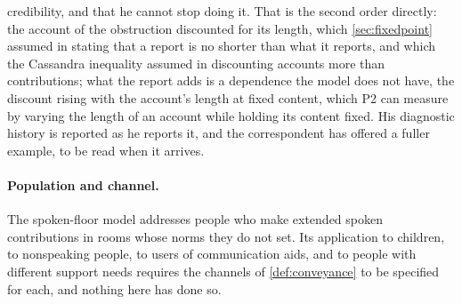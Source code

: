 credibility, and that he cannot stop doing it. That is the second order directly: the account of the obstruction discounted for its length, which \autoref{sec:fixedpoint} assumed in stating that a report is no shorter than what it reports, and which the Cassandra inequality assumed in discounting accounts more than contributions; what the report adds is a dependence the model does not have, the discount rising with the account's length at fixed content, which P2 can measure by varying the length of an account while holding its content fixed. His diagnostic history is reported as he reports it, and the correspondent has offered a fuller example, to be read when it arrives.

\paragraph{Population and channel.} The spoken-floor model addresses people who make extended spoken contributions in rooms whose norms they do not set. Its application to children, to nonspeaking people, to users of communication aids, and to people with different support needs requires the channels of \autoref{def:conveyance} to be specified for each, and nothing here has done so.

